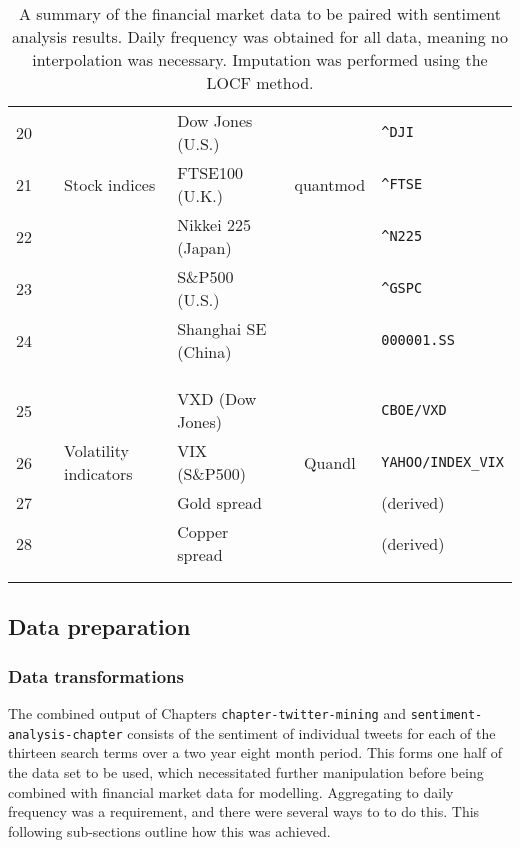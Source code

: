\documentclass{article}
\begin{document}
\begin{table}
\begin{tabular}{clllcl}
20 &  &  & Dow Jones    (U.S.) &  & \texttt{\textasciicircum{}DJI}\\
21 &  & Stock indices & FTSE100      (U.K.) & quantmod & \texttt{\textasciicircum{}FTSE}\\
22 &  &  & Nikkei 225   (Japan) &  & \texttt{\textasciicircum{}N225}\\
23 &  &  & S\&P500       (U.S.) &  & \texttt{\textasciicircum{}GSPC}\\
24 &  &  & Shanghai SE  (China) &  & \texttt{000001.SS}\\
 &  &  &  &  & \\
 &  &  &  &  & \\
\hline
 &  &  &  &  & \\
25 &  &  & VXD (Dow Jones) &  & \texttt{CBOE/VXD}\\
26 &  & Volatility indicators & VIX (S\&P500) & Quandl & \texttt{YAHOO/INDEX\_VIX}\\
27 &  &  & Gold spread &  & (derived)\\
28 &  &  & Copper spread &  & (derived)\\
 &  &  &  &  & \\
\hline
 &  &  &  &  & \\
\end{tabular}\caption[A breakdown of all financial market data used]{\label{tab:fin-data}A summary of the financial market data to be paired with sentiment analysis results. Daily frequency was obtained for all data, meaning no interpolation was necessary. Imputation was performed using the LOCF method.}

\end{table}


\subsection{Data preparation \label{data_prep}}
\label{sec-1-2}


\subsubsection{Data transformations \label{data-trans}}
\label{sec-1-2-1}

The combined output of Chapters \texttt{chapter-twitter-mining} and \texttt{sentiment-analysis-chapter} consists of the sentiment of individual tweets for each of the thirteen search terms over a two year eight month period. This forms one half of the data set to be used, which necessitated further manipulation before being combined with financial market data for modelling. Aggregating to daily frequency was a requirement, and there were several ways to to do this. This following sub-sections outline how this was achieved.
\end{document}

